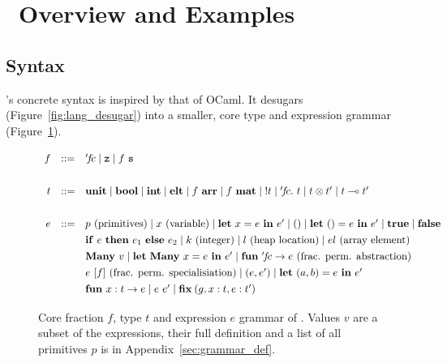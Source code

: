 \section{\lang\ Overview and Examples}\label{sec:lang_and_examples}

\subsection{Syntax}

\lang's concrete syntax is inspired by that of OCaml. It desugars
(Figure~\ref{fig:lang_desugar}) into a smaller, core type and expression
grammar (Figure~\ref{fig:core_grammar}).

\begin{figure}[p]
    \begin{center}
    \[\def\arraystretch{1.3}
    \begin{array}{rcl}
        f & ::= & {'\!f\!c}
                \mid \Zf
                \mid f\ \Sf \\
                \\
        t & ::= & \Unit
                \mid \Bool
                \mid \Int
                \mid \Elt
                \mid f\ \Arr
                \mid f\ \Mat
                \mid \Bang t
                \mid {'\!f\!c}.\ t
                \mid t \otimes t'
                \mid t \multimap t' \\
                \\
        e & ::= & p \textrm{ (primitives)}
                \mid x \textrm{ (variable)}
                \mid \Let\ x = e\ \In\ e'
                \mid ()
                \mid \Let\ () = e\ \In\ e'
                \mid \ottkw{true}
                \mid \ottkw{false}
                \\ && \ottkw{if}\ e\ \ottkw{then}\ e_1\ \ottkw{else}\ e_2
                \mid k \textrm{ (integer)}
                \mid l \textrm{ (heap location)}
                \mid el \textrm{ (array element)}
                \\ && \Many\ v
                \mid \Let\ \Many\ x = e\ \In\ e'
                \mid \ottkw{fun}\ '\!f\!c \rightarrow e
                    \textrm{ (frac. perm. abstraction)}
                \\ && e\ [f] \textrm{ (frac. perm. specialisiation)}
                \mid (e, e')
                \mid \Let\ (a,b) = e\ \In\ e'
                \\ && \ottkw{fun}\ x : t \rightarrow e
                \mid e\ e'
                \mid \ottkw{fix} \: (g, x : t, e : t')
    \end{array} \]
    \end{center}
    \caption{Core fraction $f$, type $t$ and expression $e$ grammar of
        \lang. Values $v$ are a subset of the expressions, their full
        definition and a list of all primitives $p$ is in
        Appendix~\ref{sec:grammar_def}.}\label{fig:core_grammar}
\end{figure}

